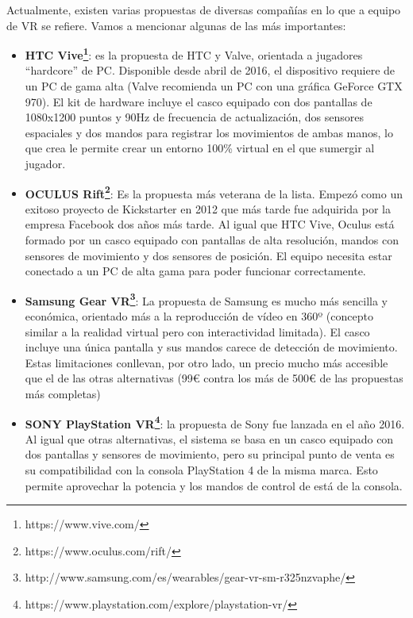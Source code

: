 Actualmente, existen varias propuestas de diversas compañías en lo que a equipo de VR se refiere. Vamos a mencionar algunas de las más importantes:
\begin{itemize}
\item \textbf{HTC Vive\footnote{https://www.vive.com/}}: es la propuesta de HTC y Valve, orientada a jugadores ``hardcore'' de PC. Disponible desde abril de 2016, el dispositivo requiere de un PC de gama alta (Valve recomienda un PC con una gráfica GeForce GTX 970). El kit de hardware incluye el casco equipado con dos pantallas de 1080x1200 puntos y 90Hz de frecuencia de actualización, dos sensores espaciales y dos mandos para registrar los movimientos de ambas manos, lo que crea le permite crear un entorno 100\% virtual en el que sumergir al jugador.

\item \textbf{OCULUS Rift\footnote{https://www.oculus.com/rift/}}: Es la propuesta más veterana de la lista. Empezó como un exitoso proyecto de Kickstarter en 2012 que más tarde fue adquirida por la empresa Facebook dos años más tarde. Al igual que HTC Vive, Oculus está formado por un casco equipado con pantallas de alta resolución, mandos con sensores de movimiento y dos sensores de posición. El equipo necesita estar conectado a un PC de alta gama para poder funcionar correctamente.

\item \textbf{Samsung Gear VR\footnote{http://www.samsung.com/es/wearables/gear-vr-sm-r325nzvaphe/}}: La propuesta de Samsung es mucho más sencilla y económica, orientado más a la reproducción de vídeo en 360º (concepto similar a la realidad virtual pero con interactividad limitada). El casco incluye una única pantalla y sus mandos carece de detección de movimiento. Estas limitaciones conllevan, por otro lado, un precio mucho más accesible que el de las otras alternativas (99€ contra los más de 500€ de las propuestas más completas)

\item \textbf{SONY PlayStation VR\footnote{https://www.playstation.com/explore/playstation-vr/}}: la propuesta de Sony fue lanzada en el año 2016. Al igual que otras alternativas, el sistema se basa en un casco equipado con dos pantallas y sensores de movimiento, pero su principal punto de venta es su compatibilidad con la consola PlayStation 4 de la misma marca. Esto permite aprovechar la potencia y los mandos de control de está de la consola.
\end{itemize}

